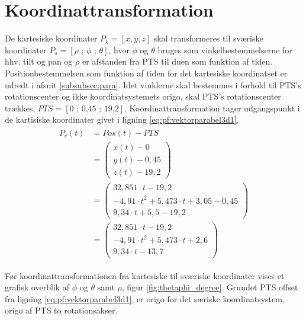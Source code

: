 \section{Koordinattransformation}
\label{sec:koordinattransformation}
De kartesiske koordinater \(P_k=[x, y, z]\) skal transformeres til sværiske koordinater \(P_s=[\rho \text{ ; } \phi \text{ ; } \theta]\), hvor \(\phi\) og \(\theta\) bruges som vinkelbestemmelserne for hhv. tilt og pan og \(\rho\) er afstanden fra PTS til duen som funktion af tiden.
Positionbestemmelsen som funktion af tiden for det kartesiske koordinatset er udredt i afsnit \ref{subsubsec:para}.
Idet vinklerne skal bestemmes i forhold til PTS's rotationscenter og ikke koordinatsystemets origo, skal PTS's rotationscenter trækkes, \(PTS=[\text{0 ; 0,45 ; 19,2}]\). Koordinattransformation tager udgangspunkt i de kartisiske koordinater givet i ligning \ref{eq:pf:vektorparabel3d1}. 
\begin{align}
\begin{split}
{ P }_{ c }\left( t \right) &=Pos\left( t \right) -PTS
\\
&=\left( \begin{matrix} x\left( t \right) -0 \\ y\left( t \right) -0,45 \\ z\left( t \right) -19,2 \end{matrix} \right) 
\\ 
&=\left( \begin{matrix} 32,851\cdot t-19,2 \\ -{ 4,91\cdot t }^{ 2 }+5,473\cdot t+3,05-0,45 \\ 9,34\cdot t+5,5-19,2 \end{matrix} \right) 
\\
&=\left( \begin{matrix} 32,851\cdot t-19,2 \\ -{ 4,91\cdot t }^{ 2 }+5,473\cdot t+2,6 \\ 9,34\cdot t-13,7 \end{matrix} \right) 
\label{eq:pf:vektorparabel3d1}
\end{split}
\end{align}

Før koordinattransformationen fra kartesiske til sværiske koordinater vises et grafisk overblik af \(\phi\) og \(\theta\) samt \(\rho\), figur \ref{fig:thetaphi_degree}. Grundet PTS offset fra ligning \ref{eq:pf:vektorparabel3d1}, er origo for det særiske koordinatsystem, origo af PTS to rotationsakser. 

